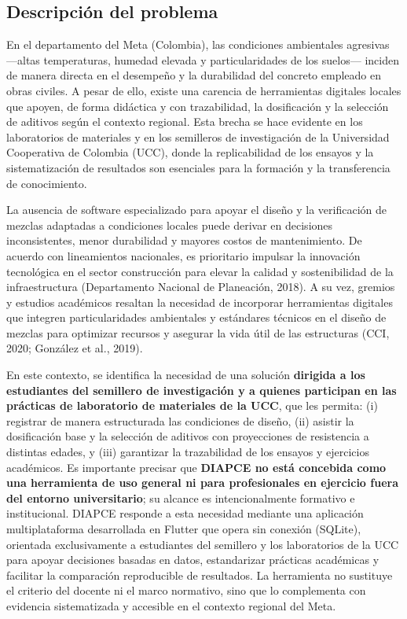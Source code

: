 \documentclass[12pt, letterpaper]{article}
\begin{document}
\subsection{Descripción del problema}

En el departamento del Meta (Colombia), las condiciones ambientales agresivas ---altas temperaturas, humedad elevada y particularidades de los suelos--- inciden de manera directa en el desempeño y la durabilidad del concreto empleado en obras civiles. A pesar de ello, existe una carencia de herramientas digitales locales que apoyen, de forma didáctica y con trazabilidad, la dosificación y la selección de aditivos según el contexto regional. Esta brecha se hace evidente en los laboratorios de materiales y en los semilleros de investigación de la Universidad Cooperativa de Colombia (UCC), donde la replicabilidad de los ensayos y la sistematización de resultados son esenciales para la formación y la transferencia de conocimiento.

La ausencia de software especializado para apoyar el diseño y la verificación de mezclas adaptadas a condiciones locales puede derivar en decisiones inconsistentes, menor durabilidad y mayores costos de mantenimiento. De acuerdo con lineamientos nacionales, es prioritario impulsar la innovación tecnológica en el sector construcción para elevar la calidad y sostenibilidad de la infraestructura (Departamento Nacional de Planeación, 2018). A su vez, gremios y estudios académicos resaltan la necesidad de incorporar herramientas digitales que integren particularidades ambientales y estándares técnicos en el diseño de mezclas para optimizar recursos y asegurar la vida útil de las estructuras (CCI, 2020; González et al., 2019).

En este contexto, se identifica la necesidad de una solución \textbf{dirigida a los estudiantes del semillero de investigación y a quienes participan en las prácticas de laboratorio de materiales de la UCC}, que les permita: (i) registrar de manera estructurada las condiciones de diseño, (ii) asistir la dosificación base y la selección de aditivos con proyecciones de resistencia a distintas edades, y (iii) garantizar la trazabilidad de los ensayos y ejercicios académicos. Es importante precisar que \textbf{DIAPCE no está concebida como una herramienta de uso general ni para profesionales en ejercicio fuera del entorno universitario}; su alcance es intencionalmente formativo e institucional. DIAPCE responde a esta necesidad mediante una aplicación multiplataforma desarrollada en Flutter que opera sin conexión (SQLite), orientada exclusivamente a estudiantes del semillero y los laboratorios de la UCC para apoyar decisiones basadas en datos, estandarizar prácticas académicas y facilitar la comparación reproducible de resultados. La herramienta no sustituye el criterio del docente ni el marco normativo, sino que lo complementa con evidencia sistematizada y accesible en el contexto regional del Meta.
\end{document}
